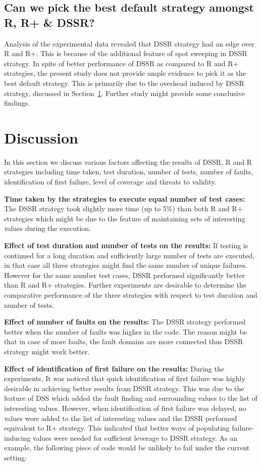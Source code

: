 \subsection{Can we pick the best default strategy amongst R, R+ \& DSSR?}

Analysis of the experimental data revealed that DSSR strategy had an edge over R and R+. This is because of the additional feature of spot sweeping in DSSR strategy. In spite of better performance of DSSR as compared to R and R+ strategies, the present study does not provide ample evidence to pick it as the best default strategy. This is primarily due to the overhead induced by DSSR strategy, discussed in Section~\ref{sec:discussion3}. Further study might provide some conclusive findings. 





\section{Discussion}\label{sec:discussion3}
In this section we discuss various factors affecting the results of DSSR, R and R strategies including time taken, test duration, number of tests, number of faults, identification of first failure, level of coverage and threats to validity.

\textbf{Time taken by the strategies to execute equal number of test cases:}
The DSSR strategy took slightly more time (up to 5\%) than both R and R+ strategies which might be due to the feature of maintaining sets of interesting values during the execution. 

\textbf{Effect of test duration and number of tests on the results:}
If testing is continued for a long duration and sufficiently large number of tests are executed, in that case all three strategies might find the same number of unique failures. However for the same number test cases, DSSR performed significantly better than R and R+ strategies. Further experiments are desirable to determine the comparative performance of the three strategies with respect to test duration and number of tests.

\textbf{Effect of number of faults on the results:} 
The DSSR strategy performed better when the number of faults was higher in the code. The reason might be that in case of more faults, the fault domains are more connected thus DSSR strategy might work better.

\textbf{Effect of identification of first failure on the results:}
During the experiments, It was noticed that quick identification of first failure was highly desirable in achieving better results from DSSR strategy. This was due to the feature of DSS which added the fault finding and surrounding values to the list of interesting values. However, when identification of first failure was delayed, no values were added to the list of interesting values and the DSSR performed equivalent to R+ strategy. This indicated that better ways of populating failure-inducing values were needed for sufficient leverage to DSSR strategy. As an example, the following piece of code would be unlikely to fail under the current setting:

